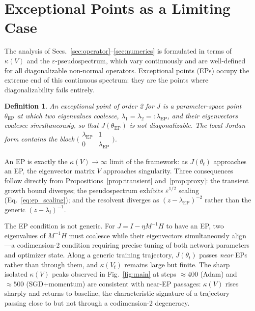 \documentclass[aps,prresearch,twocolumn,superscriptaddress,longbibliography]{revtex4-2}
\newtheorem{definition}{Definition}
\begin{document}
\section{Exceptional Points as a Limiting Case}
\label{sec:ep}

The analysis of Secs.~\ref{sec:operator}--\ref{sec:numerics} is
formulated in terms of $\kappa(V)$ and the $\varepsilon$-pseudospectrum,
which vary continuously and are well-defined for all diagonalizable
non-normal operators.
Exceptional points (EPs) occupy the extreme end of this continuous
spectrum: they are the points where diagonalizability fails entirely.

\begin{definition}
An exceptional point of order 2 for $J$ is a parameter-space point
$\theta_{\mathrm{EP}}$ at which two eigenvalues coalesce,
$\lambda_1 = \lambda_2 =:\lambda_{\mathrm{EP}}$, and their eigenvectors
coalesce simultaneously, so that $J(\theta_{\mathrm{EP}})$ is not
diagonalizable.
The local Jordan form contains the block
$\bigl(\begin{smallmatrix}\lambda_{\mathrm{EP}}&1\\0&\lambda_{\mathrm{EP}}\end{smallmatrix}\bigr)$.
\end{definition}

An EP is exactly the $\kappa(V)\to\infty$ limit of the framework: as
$J(\theta_t)$ approaches an EP, the eigenvector matrix $V$ approaches
singularity.
Three consequences follow directly from Propositions~\ref{prop:transient}
and~\ref{prop:proxy}: the transient growth bound diverges; the
pseudospectrum exhibits $\varepsilon^{1/2}$ scaling (Eq.~\eqref{eq:ep_scaling});
and the resolvent diverges as $(z-\lambda_{\mathrm{EP}})^{-2}$ rather
than the generic $(z-\lambda_i)^{-1}$.

The EP condition is not generic.
For $J = I-\eta M^{-1}H$ to have an EP, two eigenvalues of $M^{-1}H$
must coalesce while their eigenvectors simultaneously align---a
codimension-2 condition requiring precise tuning of both network
parameters and optimizer state.
Along a generic training trajectory, $J(\theta_t)$ passes \emph{near}
EPs rather than through them, and $\kappa(V_t)$ remains large but
finite.
The sharp isolated $\kappa(V)$ peaks observed in Fig.~\ref{fig:main}
at steps $\approx 400$ (Adam) and $\approx 500$ (SGD+momentum) are
consistent with near-EP passages: $\kappa(V)$ rises sharply and returns
to baseline, the characteristic signature of a trajectory passing close
to but not through a codimension-2 degeneracy.
\end{document}
